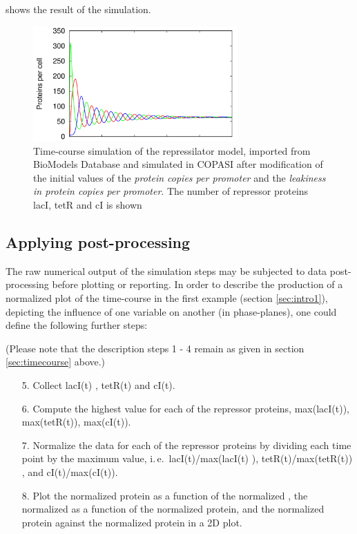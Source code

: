  shows the result of the simulation.

\begin{figure}
\centering
\includegraphics[width=0.7\textwidth]{examples/rep_pre.png}
\caption{Time-course simulation of the repressilator model, imported from BioModels Database and simulated in COPASI after modification of the initial values of the \emph{protein copies per promoter} and the \emph{leakiness in protein copies per promoter}. The number of repressor proteins lacI, tetR and cI is shown}
\label{fig:rep_pre}
\end{figure}

\subsection{Applying post-processing}
\label{sec:postprocessing}
The raw numerical output of the simulation steps may be subjected to data post-processing before plotting or reporting.  In order to describe the production of a normalized plot of the time-course in the first example (section \ref{sec:intro1}), depicting the influence of one variable on another (in phase-planes), one could define the following further steps:

(Please note that the description steps 1 - 4 remain as given in section \ref{sec:timecourse} above.)
\begin{enumerate}
\item[5.]{Collect lacI(t) , tetR(t) and cI(t).}
\item[6.]{Compute the highest value for each of the repressor proteins,  max(lacI(t)), max(tetR(t)), max(cI(t)).}
\item[7.]{Normalize the data for each of the repressor proteins by dividing each time point by the maximum value, i.\,e.\ lacI(t)/max(lacI(t) ), tetR(t)/max(tetR(t)) , and cI(t)/max(cI(t)).}
\item[8.]{Plot the normalized  protein as a function of the normalized , the normalized   as a function of the normalized  protein, and the normalized  protein against the normalized  protein in a 2D plot.}
\end{enumerate}

